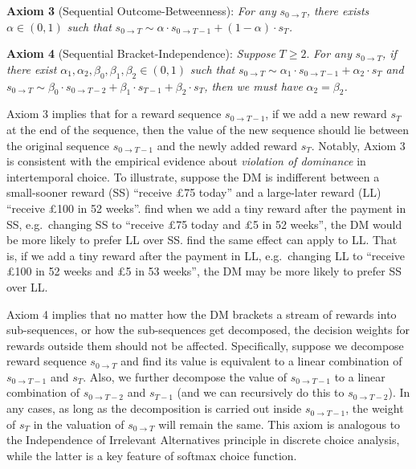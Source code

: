 \documentclass[
  12pt,
]{article}
\begin{document}
\noindent \textbf{Axiom 3} (Sequential Outcome-Betweenness): \emph{For
any} \(s_{0\rightarrow T}\)\emph{, there exists} \(\alpha\in(0,1)\)
\emph{such that}
\(s_{0\rightarrow T} \sim \alpha\cdot s_{0\rightarrow T-1}+(1-\alpha) \cdot s_T\)\emph{.}

\noindent \textbf{Axiom 4} (Sequential Bracket-Independence):
\emph{Suppose} \(T\geq 2\). \emph{For any} \(s_{0\rightarrow T}\)\emph{,
if there exist} \(\alpha_1,\alpha_2,\beta_0,\beta_1,\beta_2\in(0,1)\)
\emph{such that}
\(s_{0\rightarrow T}\sim \alpha_1 \cdot s_{0\rightarrow T-1} + \alpha_2 \cdot s_{T}\)
\emph{and}
\(s_{0\rightarrow T}\sim \beta_0 \cdot s_{0\rightarrow T-2}+\beta_1 \cdot s_{T-1}+\beta_2 \cdot s_{T}\)\emph{,
then we must have} \(\alpha_2 = \beta_2\)\emph{.}

Axiom 3 implies that for a reward sequence \(s_{0\rightarrow T-1}\), if
we add a new reward \(s_T\) at the end of the sequence, then the value
of the new sequence should lie between the original sequence
\(s_{0\rightarrow T-1}\) and the newly added reward \(s_T\). Notably,
Axiom 3 is consistent with the empirical evidence about \emph{violation
of dominance} \citep{scholten2014better, jiang2017better} in
intertemporal choice. To illustrate, suppose the DM is indifferent
between a small-sooner reward (SS) ``receive £75 today'' and a
large-later reward (LL) ``receive £100 in 52 weeks''.
\citet{scholten2014better} find when we add a tiny reward after the
payment in SS, e.g.~changing SS to ``receive £75 today and £5 in 52
weeks'', the DM would be more likely to prefer LL over SS.
\citet{jiang2017better} find the same effect can apply to LL. That is,
if we add a tiny reward after the payment in LL, e.g.~changing LL to
``receive £100 in 52 weeks and £5 in 53 weeks'', the DM may be more
likely to prefer SS over LL.

Axiom 4 implies that no matter how the DM brackets a stream of rewards
into sub-sequences, or how the sub-sequences get decomposed, the
decision weights for rewards outside them should not be affected.
Specifically, suppose we decompose reward sequence
\(s_{0\rightarrow T}\) and find its value is equivalent to a linear
combination of \(s_{0\rightarrow T-1}\) and \(s_T\). Also, we further
decompose the value of \(s_{0\rightarrow T-1}\) to a linear combination
of \(s_{0\rightarrow T-2}\) and \(s_{T-1}\) (and we can recursively do
this to \(s_{0\rightarrow T-2}\)). In any cases, as long as the
decomposition is carried out inside \(s_{0\rightarrow T-1}\), the weight
of \(s_T\) in the valuation of \(s_{0\rightarrow T}\) will remain the
same. This axiom is analogous to the Independence of Irrelevant
Alternatives principle in discrete choice analysis, while the latter is
a key feature of softmax choice function.
\end{document}
